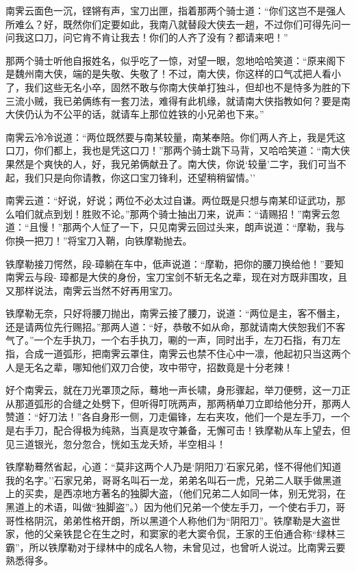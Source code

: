 \documentclass[12pt,oneside]{book}
\begin{document}
南霁云面色一沉，铿锵有声，宝刀出匣，指着那两个骑士道：``你们这岂不是强人所难么？好，既然你们定要如此，我南八就替段大侠去一趟，不过你们可得先问一问我这口刀，问它肯不肯让我去！你们的人齐了没有？都请来吧！''

那两个骑士听他自报姓名，似乎吃了一惊，对望一眼，忽地哈哈笑道：``原来阁下是魏州南大侠，端的是失敬、失敬了！不过，南大侠，你这样的口气忒把人看小了，我们这些无名小卒，固然不敢与你南大侠单打独斗，但却也不是恃多为胜的下三流小贼，我已弟俩练有一套刀法，难得有此机缘，就请南大侠指教如何？要是南大侠仍认为不公平的话，就请车上那位姓铁的小兄弟也下来。''

南霁云冷冷说道：``两位既然要与南某较量，南某奉陪。你们两人齐上，我是凭这口刀，你们都上，我也是凭这口刀！''那两个骑士跳下马背，又哈哈笑道：``南大侠果然是个爽快的人，好，我兄弟俩献丑了。南大侠，你说`较量'二字，我们可当不起，我们只是向你请教，你这口宝刀锋利，还望稍稍留情。''

南霁云道：``好说，好说；两位不必太过自谦。两位既是只想与南某印证武功，那么咱们就点到划！胜败不论。''那两个骑士抽出刀来，说声：``请赐招！''南霁云忽道：``且慢！''那两个人怔了一下，只见南霁云回过头来，朗声说道：``摩勒，我与你换一把刀！''将宝刀入鞘，向铁摩勒抛去。

铁摩勒接刀愕然，段-璋躺在车中，低声说道：``摩勒，把你的腰刀换给他！''要知南霁云与段-
璋都是大侠的身份，宝刀宝剑不斩无名之辈，现在对方既非围攻，且又那样说法，南霁云当然不好再用宝刀。

铁摩勒无奈，只好将腰刀抛出，南霁云接了腰刀，说道：``两位是主，客不僭主，还是请两位先行赐招。''那两人道：``好，恭敬不如从命，那就请南大侠恕我们不客气了。''一个左手执刀，一个右手执刀，唰的一声，同时出手，左刀石指，有刀左指，合成一道弧形，把南霁云罩住，南霁云也禁不住心中一凛，他起初只当这两个人是无名之辈，哪知他们双刀合使，攻中带守，招数竟是十分老辣！

好个南霁云，就在刀光罩顶之际，蓦地一声长啸，身形骤起，举刀便劈，这一刀正从那道弧形的合缝之处劈下，但听得叮咣两声，那两柄单刀立即给他分开，那两人赞道：``好刀法！''各自身形一侧，刀走偏锋，左右夹攻，他们一个是左手刀，一个是右手刀，配合得极为纯熟，当真是攻守兼备，无懈可击！铁摩勒从车上望去，但见三道银光，忽分忽合，恍如玉龙夭矫，半空相斗！

铁摩勒蓦然省起，心道：``莫非这两个人乃是`阴阳刀'石家兄弟，怪不得他们知道我的名字。''石家兄弟，哥哥名叫石一龙，弟弟名叫石一虎，兄弟二人联手做黑道上的买卖，是西凉地方著名的独脚大盗，（他们兄弟二人如同一体，别无党羽，在黑道上的术语，叫做``独脚盗''。）因为他们兄弟一个使左手刀，一个使右手刀，哥哥性格阴沉，弟弟性格开朗，所以黑道个人称他们为``阴阳刀''。铁摩勒是大盗世家，他的父亲铁昆仑在生之时，和窦家的老大窦令侃，王家的王伯通合称``绿林三霸''，所以铁摩勒对于绿林中的成名人物，未曾见过，也曾听人说过。比南霁云要熟悉得多。
\end{document}
